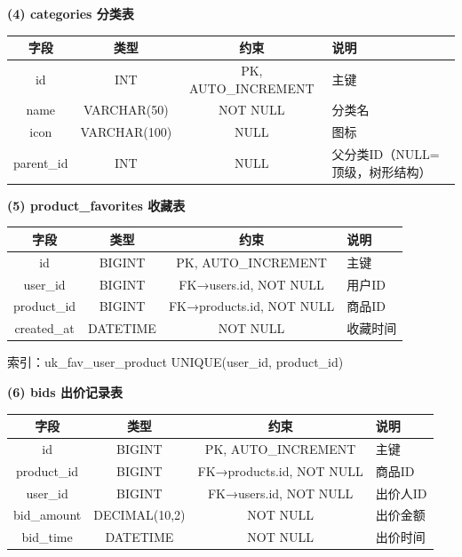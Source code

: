 \documentclass[12pt,a4paper]{ctexart}
\numberwithin{figure}{section}
\numberwithin{table}{section}
\begin{document}
\textbf{(4) categories 分类表}

\begin{center}
\renewcommand{\arraystretch}{1.3}
\begin{tabular}{|c|c|c|p{5cm}|}
\hline
\rowcolor{tableheader}
\textbf{字段} & \textbf{类型} & \textbf{约束} & \textbf{说明} \\
\hline
id & INT & PK, AUTO\_INCREMENT & 主键 \\
\hline
name & VARCHAR(50) & NOT NULL & 分类名 \\
\hline
icon & VARCHAR(100) & NULL & 图标 \\
\hline
parent\_id & INT & NULL & 父分类ID（NULL=顶级，树形结构） \\
\hline
\end{tabular}
\end{center}

\textbf{(5) product\_favorites 收藏表}

\begin{center}
\renewcommand{\arraystretch}{1.3}
\begin{tabular}{|c|c|c|p{5cm}|}
\hline
\rowcolor{tableheader}
\textbf{字段} & \textbf{类型} & \textbf{约束} & \textbf{说明} \\
\hline
id & BIGINT & PK, AUTO\_INCREMENT & 主键 \\
\hline
user\_id & BIGINT & FK→users.id, NOT NULL & 用户ID \\
\hline
product\_id & BIGINT & FK→products.id, NOT NULL & 商品ID \\
\hline
created\_at & DATETIME & NOT NULL & 收藏时间 \\
\hline
\end{tabular}
\end{center}

索引：uk\_fav\_user\_product UNIQUE(user\_id, product\_id)

\textbf{(6) bids 出价记录表}

\begin{center}
\renewcommand{\arraystretch}{1.3}
\begin{tabular}{|c|c|c|p{5cm}|}
\hline
\rowcolor{tableheader}
\textbf{字段} & \textbf{类型} & \textbf{约束} & \textbf{说明} \\
\hline
id & BIGINT & PK, AUTO\_INCREMENT & 主键 \\
\hline
product\_id & BIGINT & FK→products.id, NOT NULL & 商品ID \\
\hline
user\_id & BIGINT & FK→users.id, NOT NULL & 出价人ID \\
\hline
bid\_amount & DECIMAL(10,2) & NOT NULL & 出价金额 \\
\hline
bid\_time & DATETIME & NOT NULL & 出价时间 \\
\hline
\end{tabular}
\end{center}
\end{document}
